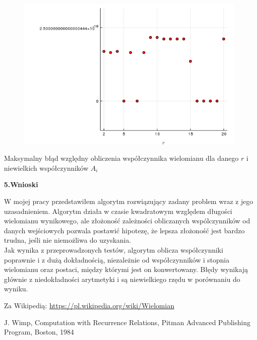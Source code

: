 \documentclass[a4paper]{article}
\begin{document}
\begin{figure}[h!]
  \includegraphics[width=14cm]{error2_Czebyszew_to_binomial.png}
\end{figure}
\newpage
\begin{center}
Maksymalny błąd względny obliczenia współczynnika wielomianu dla danego $r$ i niewielkich współczynników $A_i$
\end{center}
\hfill
\hfill
\hfill

\Large
\textbf{5.Wnioski}
\normalsize

W mojej pracy przedstawiłem algorytm rozwiązujący zadany problem wraz z jego uzasadnieniem. Algorytm działa w czasie kwadratowym względem długości wielomianu wynikowego, ale złożoność zależności obliczanych wspólczynników od danych wejściowych pozwala postawić hipotezę, że lepsza złożoność jest bardzo trudna, jeśli nie niemożliwa do uzyskania.\\

Jak wynika z przeprowadzonych testów, algorytm  oblicza współczynniki poprawnie i z dużą dokładnością, niezależnie od współczynników i stopnia wielomianu oraz postaci, między którymi jest on konwertowany. Błędy wynikają głównie z niedokładności arytmetyki i są niewielkiego rzędu w porównaniu do wyniku.

\newpage
\begin{thebibliography}{9}
\itemsep2pt

 Za Wikipedią: \url{https://pl.wikipedia.org/wiki/Wielomian}

 J. Wimp, Computation with Recurrence Relations, Pitman Advanced Publishing Program, Boston, 1984

\end{thebibliography}
\end{document}
